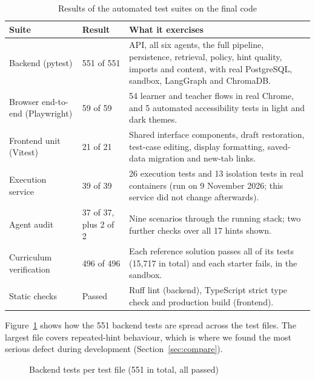 \begin{table}[htbp]\centering\small
\caption{Results of the automated test suites on the final code}\label{tab:tests}
\begin{tabular}{|R{3.6cm}|R{2.2cm}|R{7.6cm}|}\hline
\textbf{Suite} & \textbf{Result} & \textbf{What it exercises}\\\hline
Backend (pytest) & 551 of 551 & API, all six agents, the full pipeline, persistence, retrieval, policy, hint quality, imports and content, with real PostgreSQL, sandbox, LangGraph and ChromaDB.\\\hline
Browser end-to-end (Playwright) & 59 of 59 & 54 learner and teacher flows in real Chrome, and 5 automated accessibility tests in light and dark themes.\\\hline
Frontend unit (Vitest) & 21 of 21 & Shared interface components, draft restoration, test-case editing, display formatting, saved-data migration and new-tab links.\\\hline
Execution service & 39 of 39 & 26 execution tests and 13 isolation tests in real containers (run on 9 November 2026; this service did not change afterwards).\\\hline
Agent audit & 37 of 37, plus 2 of 2 & Nine scenarios through the running stack; two further checks over all 17 hints shown.\\\hline
Curriculum verification & 496 of 496 & Each reference solution passes all of its tests (15,717 in total) and each starter fails, in the sandbox.\\\hline
Static checks & Passed & Ruff lint (backend), TypeScript strict type check and production build (frontend).\\\hline
\end{tabular}
\end{table}

Figure~\ref{fig:backend-tests} shows how the 551 backend tests are spread across the test files. The largest file covers repeated-hint behaviour, which is where we found the most serious defect during development (Section~\ref{sec:compare}).

\begin{figure}[htbp]\centering
{}
\caption{Backend tests per test file (551 in total, all passed)}\label{fig:backend-tests}
\end{figure}

